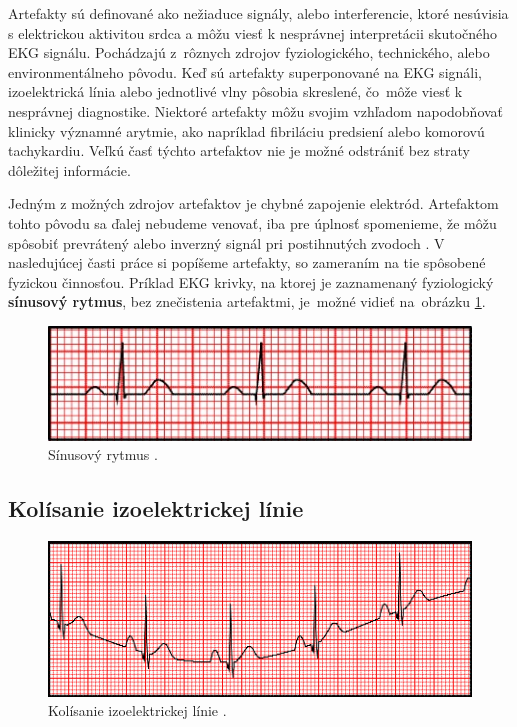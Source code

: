 Artefakty sú definované ako nežiaduce signály, alebo interferencie, ktoré nesúvisia s elektrickou aktivitou srdca a môžu viesť k nesprávnej interpretácii skutočného EKG signálu. Pochádzajú z~rôznych zdrojov fyziologického, technického, alebo environmentálneho pôvodu. Keď sú artefakty superponované na EKG signáli, izoelektrická línia alebo jednotlivé vlny pôsobia skreslené, čo~môže viesť k nesprávnej diagnostike. Niektoré artefakty môžu svojim vzhľadom napodobňovať klinicky významné arytmie, ako napríklad fibriláciu predsiení alebo komorovú tachykardiu. Veľkú časť týchto artefaktov nie je možné odstrániť bez straty dôležitej informácie. 

Jedným z možných zdrojov artefaktov je chybné zapojenie elektród. Artefaktom tohto pôvodu sa ďalej nebudeme venovať, iba pre úplnosť spomenieme, že môžu spôsobiť prevrátený alebo inverzný signál pri postihnutých zvodoch \cite{PrezRiera2017}\cite{Littmann2021}. V nasledujúcej časti práce si popíšeme artefakty, so zameraním na tie spôsobené fyzickou činnosťou. Príklad EKG krivky, na ktorej je zaznamenaný fyziologický \textbf{sínusový rytmus}, bez znečistenia artefaktmi, je~možné vidieť na~obrázku \ref{fig:sinus}.

\begin{figure}[H]
    \centering
    \includegraphics[scale=0.72]{img/sinus.jpg}
    \caption{Sínusový rytmus \cite{Mauvila_2018}.}
    \label{fig:sinus}
\end{figure}

\subsection{Kolísanie izoelektrickej línie}

\begin{figure}[H]
    \centering
    \includegraphics[scale=0.7]{img/baseline.jpg}
    \caption{Kolísanie izoelektrickej línie \cite{Mauvila_2018}.}
\end{figure}

